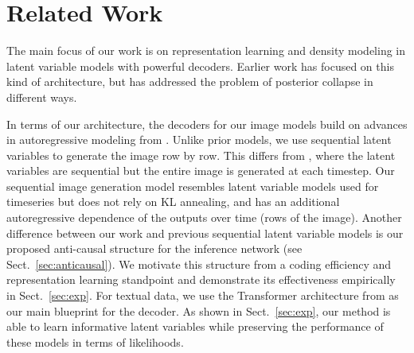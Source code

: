 \documentclass{article} \usepackage{iclr2019_conference,times}
\newcommand{\sref}[1]{Sect.~\ref{#1}}
\begin{document}
 \section{Related Work}
The main focus of our work is on representation learning and density modeling in latent variable models with powerful decoders. Earlier work has focused on this kind of architecture, but has addressed the problem of posterior collapse in different ways. 


In terms of our architecture, the decoders for our image models build on advances in autoregressive modeling from \citet{pixelcnn, PixelCNN++, PixelSnail, ImageTransformer}. Unlike prior models, we use sequential latent variables to generate the image row by row. This differs from \citet{ConvDraw}, where the latent variables are sequential but the entire image is generated at each timestep. 
Our sequential image generation model resembles latent variable models used for timeseries \citep{VRNN, Babaeizadeh2017, Denton2018} but does not rely on KL annealing, and has an additional autoregressive dependence of the outputs over time (rows of the image). Another difference between our work and previous sequential latent variable models is our proposed anti-causal structure for the inference network (see \sref{sec:anticausal}). We motivate this structure from a coding efficiency and representation learning standpoint and demonstrate its effectiveness empirically in \sref{sec:exp}. For textual data, we use the Transformer architecture from \citet{Vaswani2017} as our main blueprint for the decoder. As shown in \sref{sec:exp}, our method is able to learn informative latent variables while preserving the performance of these models in terms of likelihoods.
\end{document}
